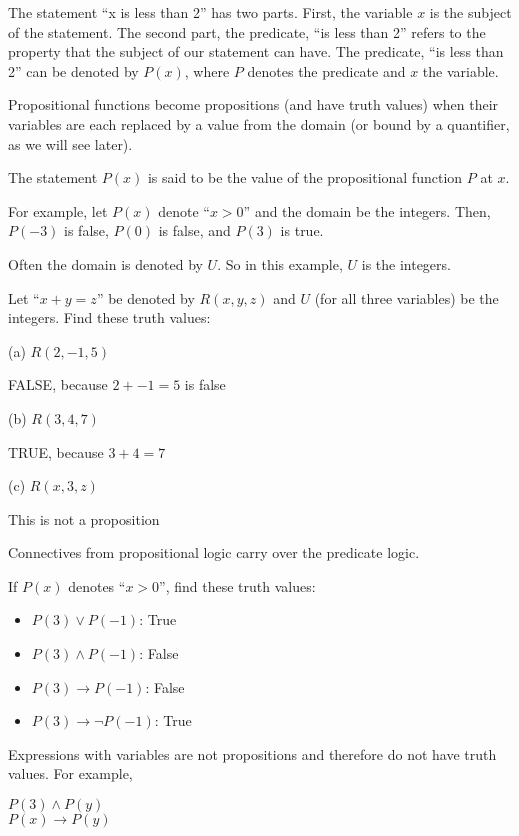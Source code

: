 \documentclass[../discrete.tex]{subfiles}
\begin{document}
The statement ``x is less than 2'' has two parts. First, the variable $x$ is the subject of the statement. The second part, the predicate, ``is less than 2'' refers to the property that the subject of our statement can have. The predicate, ``is less than 2'' can be denoted by $P(x)$, where $P$ denotes the predicate and $x$ the variable.

Propositional functions become propositions (and have truth values) when their variables are each replaced by a value from the domain (or bound by a quantifier, as we will see later).

The statement $P(x)$ is said to be the value of the propositional function $P$ at $x$.

For example, let $P(x)$ denote ``$x>0$'' and the domain be the integers. Then, $P(-3)$ is false, $P(0)$ is false, and $P(3)$ is true.

Often the domain is denoted by $U$. So in this example, $U$ is the integers.

\begin{example}
    Let ``$x+y=z$'' be denoted by $R(x,y,z)$ and $U$ (for all three variables) be the integers. Find these truth values:

    (a) $R(2,-1,5)$

    FALSE, because $2+-1=5$ is false 

    (b) $R(3,4,7)$

    TRUE, because $3+4=7$

    (c) $R(x,3,z)$

    This is not a proposition 
\end{example}

Connectives from propositional logic carry over the predicate logic.

If $P(x)$ denotes ``$x>0$'', find these truth values:
\begin{itemize}
    \item $P(3)\lor P(-1)$: True 
    \item $P(3)\land P(-1)$: False 
    \item $P(3)\rightarrow P(-1)$: False 
    \item $P(3)\rightarrow \neg P(-1)$: True 
\end{itemize}

Expressions with variables are not propositions and therefore do not have truth values. For example, 
\begin{center}
    $P(3)\land P(y)$ \\
    $P(x)\rightarrow P(y)$
\end{center}
\end{document}
